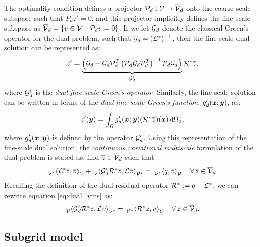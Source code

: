 The optimality condition defines a projector
$\mathcal{P}_d : \mathcal{V} \to \overline{\mathcal{V}}_d$ onto the coarse-scale subspace
such that $P_d z' = 0$, and this projector implicitly
defines the fine-scale subspace as
$\overline{\mathcal{V}}_d = \{ v \in \mathcal{V} \, : \, \mathcal{P}_d v = 0 \}$. If we
let $\mathcal{G}_d$ denote the classical Green's operator for
the dual problem, such that $\mathcal{G}_d = (\mathcal{L}^*)^{-1}$, then
the fine-scale dual solution can be represented as:
%
\begin{gather}
z' = \underbrace{
\left(
\mathcal{G}_d - \mathcal{G}_d \mathcal{P}_d^T \left( \mathcal{P}_d \mathcal{G}_d \mathcal{P}_d^T \right) ^{-1} \mathcal{P}_d \mathcal{G}_d
\right)
}
_{\mathcal{G}'_d} \mathcal{R}^* \overline{z},
\label{eq:dual_fine_operator}
\end{gather}
%
where $\mathcal{G}'_d$ is the \emph{dual fine-scale Green's operator}.
Similarly, the fine-scale solution can be written in terms
of the \emph{dual fine-scale Green's function}, $g'_d(\boldsymbol{x};\boldsymbol{y})$,
as:
%
\begin{gather}
z'(\boldsymbol{y}) = \int_{\Omega} g'_d(\boldsymbol{x};\boldsymbol{y}) (\mathcal{R}^* \overline{z})(\boldsymbol{x})
\, \text{d} \Omega_x,
\label{eq:dual_fine_function}
\end{gather}
where $g'_d(\boldsymbol{x};\boldsymbol{y})$ is defined by the operator $\mathcal{G}'_d$.
Using this representation of the fine-scale dual solution,
the \emph{continuous variational multiscale} formulation of
the dual problem is stated as: find $\overline{z} \in \overline{\mathcal{V}}_d$
such that
%
\begin{gather}
\,{}_{\mathcal{V}^*}^{}\!\left< {\mathcal{L}^* \overline{z}}, {\overline{v}} \right>_{\mathcal{V}} +
\,{}_{\mathcal{V}}^{}\!\left< {\mathcal{G}'_d \mathcal{R}^* \overline{z}}, {\mathcal{L} \overline{v}} \right>_{\mathcal{V}^*} =
\,{}_{\mathcal{V}^*}^{}\!\left< {q}, {\overline{v}} \right>_{\mathcal{V}}
\quad \forall \, \overline{z} \in \overline{\mathcal{V}}_d.
\label{eq:dual_vms}
\end{gather}
%
Recalling the definition of the dual residual operator
$\mathcal{R}^* := q - \mathcal{L}^*$, we can rewrite equation \eqref{eq:dual_vms}
as:
%
\begin{gather}
\,{}_{\mathcal{V}}^{}\!\left< {\mathcal{G}'_d \mathcal{R}^* \overline{z}}, {\mathcal{L} \overline{v}} \right>_{\mathcal{V}^*} =
\,{}_{\mathcal{V}^*}^{}\!\left< {\mathcal{R}^* \overline{z}}, {\overline{v}} \right>_{\mathcal{V}}
\quad \forall \, \overline{z} \in \overline{\mathcal{V}}_d.
\label{eq:dual_vms_2}
\end{gather}
%

\subsection{Subgrid model}

